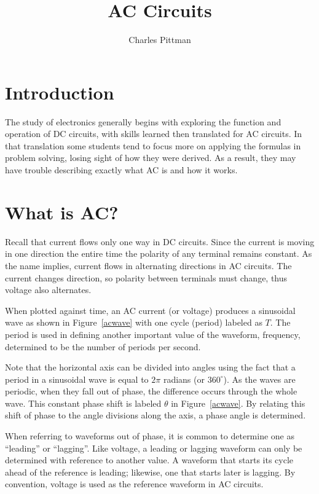 \documentclass[12pt]{article}
\author{Charles Pittman}
\title{AC Circuits}
\begin{document}
\maketitle

\section*{Introduction}

The study of electronics generally begins with exploring the function and
operation of \ac{DC} circuits, with skills learned then translated for \ac{AC}
circuits.  In that translation some students tend to focus more on applying the
formulas in problem solving, losing sight of how they were derived.  As a
result, they may have trouble describing exactly what \ac{AC} is and how it
works.

\section*{What is \ac{AC}?}

Recall that current flows only one way in \ac{DC} circuits.  Since the current
is moving in one direction the entire time the polarity of any terminal remains
constant.  As the name implies, current flows in alternating directions in
\ac{AC} circuits.  The current changes direction, so polarity between terminals
must change, thus voltage also alternates.

When plotted against time, an \ac{AC} current (or voltage) produces a
sinusoidal wave as shown in Figure~\ref{acwave} with one cycle (period) labeled
as $T$.  The period is used in defining another important value of the
waveform, frequency, determined to be the number of periods per second.

Note that the horizontal axis can be divided into angles using the fact that a
period in a sinusoidal wave is equal to $2\pi$ radians (or $360^\circ$).  As
the waves are periodic, when they fall out of phase, the difference occurs
through the whole wave.  This constant phase shift is labeled $\theta$ in
Figure~\ref{acwave}.  By relating this shift of phase to the angle divisions
along the axis, a phase angle is determined.

When referring to waveforms out of phase, it is common to determine one as
``leading'' or ``lagging''.  Like voltage, a leading or lagging waveform can
only be determined with reference to another value.  A waveform that starts its
cycle ahead of the reference is leading; likewise, one that starts later is
lagging.  By convention, voltage is used as the reference waveform in \ac{AC}
circuits.
\end{document}
